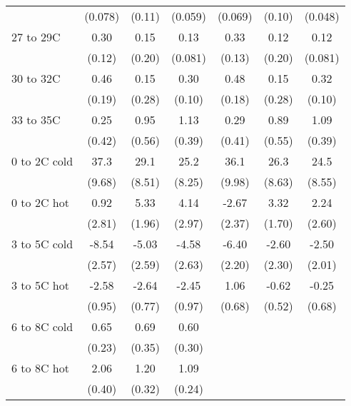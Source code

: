 \documentclass[paper=letterpaper, fontsize=11pt]{article} %
\begin{document}
\begin{longtable}{l*{6}{c}}
                    &     (0.078)&      (0.11)&     (0.059)&     (0.069)&      (0.10)&     (0.048)\\
27 to 29C           &        0.30&        0.15&        0.13&        0.33&        0.12&        0.12\\
                    &      (0.12)&      (0.20)&     (0.081)&      (0.13)&      (0.20)&     (0.081)\\
30 to 32C           &        0.46&        0.15&        0.30&        0.48&        0.15&        0.32\\
                    &      (0.19)&      (0.28)&      (0.10)&      (0.18)&      (0.28)&      (0.10)\\
33 to 35C           &        0.25&        0.95&        1.13&        0.29&        0.89&        1.09\\
                    &      (0.42)&      (0.56)&      (0.39)&      (0.41)&      (0.55)&      (0.39)\\
0 to 2C cold        &        37.3&        29.1&        25.2&        36.1&        26.3&        24.5\\
                    &      (9.68)&      (8.51)&      (8.25)&      (9.98)&      (8.63)&      (8.55)\\
0 to 2C hot         &        0.92&        5.33&        4.14&       -2.67&        3.32&        2.24\\
                    &      (2.81)&      (1.96)&      (2.97)&      (2.37)&      (1.70)&      (2.60)\\
3 to 5C cold        &       -8.54&       -5.03&       -4.58&       -6.40&       -2.60&       -2.50\\
                    &      (2.57)&      (2.59)&      (2.63)&      (2.20)&      (2.30)&      (2.01)\\
3 to 5C hot         &       -2.58&       -2.64&       -2.45&        1.06&       -0.62&       -0.25\\
                    &      (0.95)&      (0.77)&      (0.97)&      (0.68)&      (0.52)&      (0.68)\\
6 to 8C cold        &        0.65&        0.69&        0.60&            &            &            \\
                    &      (0.23)&      (0.35)&      (0.30)&            &            &            \\
6 to 8C hot         &        2.06&        1.20&        1.09&            &            &            \\
                    &      (0.40)&      (0.32)&      (0.24)&            &            &            \\

\end{longtable}
\end{document}

